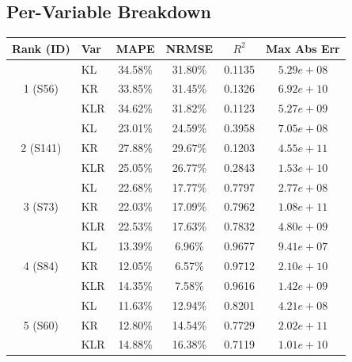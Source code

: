\documentclass[11pt,a4paper]{article}
\begin{document}
\subsection{Per-Variable Breakdown}
\begin{table}[h]
\centering
\begin{tabular}{clcccc}
\toprule
\textbf{Rank (ID)} & \textbf{Var} & \textbf{MAPE} & \textbf{NRMSE} & \textbf{$R^2$} & \textbf{Max Abs Err} \\
\midrule
    \multirow{3}{*}{1 (S56)} & KL & 34.58\% & 31.80\% & 0.1135 & $5.29e+08$ \\
     & KR & 33.85\% & 31.45\% & 0.1326 & $6.92e+10$ \\
     & KLR & 34.62\% & 31.82\% & 0.1123 & $5.27e+09$ \\
    \hline
    \multirow{3}{*}{2 (S141)} & KL & 23.01\% & 24.59\% & 0.3958 & $7.05e+08$ \\
     & KR & 27.88\% & 29.67\% & 0.1203 & $4.55e+11$ \\
     & KLR & 25.05\% & 26.77\% & 0.2843 & $1.53e+10$ \\
    \hline
    \multirow{3}{*}{3 (S73)} & KL & 22.68\% & 17.77\% & 0.7797 & $2.77e+08$ \\
     & KR & 22.03\% & 17.09\% & 0.7962 & $1.08e+11$ \\
     & KLR & 22.53\% & 17.63\% & 0.7832 & $4.80e+09$ \\
    \hline
    \multirow{3}{*}{4 (S84)} & KL & 13.39\% & 6.96\% & 0.9677 & $9.41e+07$ \\
     & KR & 12.05\% & 6.57\% & 0.9712 & $2.10e+10$ \\
     & KLR & 14.35\% & 7.58\% & 0.9616 & $1.42e+09$ \\
    \hline
    \multirow{3}{*}{5 (S60)} & KL & 11.63\% & 12.94\% & 0.8201 & $4.21e+08$ \\
     & KR & 12.80\% & 14.54\% & 0.7729 & $2.02e+11$ \\
     & KLR & 14.88\% & 16.38\% & 0.7119 & $1.01e+10$ \\
    \hline
\bottomrule
\end{tabular}
\end{table}
\end{document}
